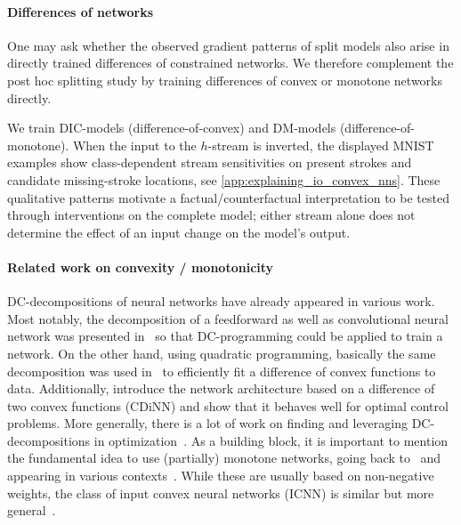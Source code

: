 \paragraph{Differences of networks}
One may ask whether the observed gradient patterns of split models also arise in directly trained differences of constrained networks.
We therefore complement the post hoc splitting study by training differences of convex or monotone networks directly.

We train DIC-models (difference-of-convex) and DM-models (difference-of-monotone). 
When the input to the $h$-stream is inverted, the displayed MNIST examples show class-dependent
stream sensitivities on present strokes and candidate missing-stroke locations, see
\cref{app:explaining_io_convex_nns}. These qualitative patterns motivate a factual/counterfactual
interpretation to be tested through interventions on the complete model; either stream alone
does not determine the effect of an input change on the model's output.

\paragraph{Related work on convexity / monotonicity} 
DC-decompositions of neural networks have already appeared in various work. 
Most notably, the decomposition of a feedforward as well as convolutional neural network was presented in~\citep{Awasthi2023DCNN} so that DC-programming could be applied to train a network. On the other hand, using quadratic programming, basically the same decomposition was used in~\citep{Siahkamari2020_DCRegression} to efficiently fit a difference of convex functions to data. 
Additionally, \citep{Sankaranarayanan2021CDINN} introduce the network architecture based on a difference of two convex functions (CDiNN) and show that it behaves well for optimal control problems.  
More generally, there is a lot of work on finding and leveraging DC-decompositions in optimization~\citep{Melzer1986_PLasDC,Kripfganz1987_PWAasDC,Zalgaller2000_DCRepresentation,Griewank2020_PolyhedralDCDecomposition,Schlueter2021_ConvexDecompPAF,Koutschan2024_MinimalArity,Kazda2024_LP_DCPLA,Brandenburg2025_DecompositionPolyhedra}.
As a building block, it is important to mention the fundamental idea to use (partially) monotone networks, going back to~\citep{Sill1997_MonotonicNetworks}
and appearing in various contexts~\citep{Sivaraman2020_COMET,sivaprasad2021curious,Nguyen2023_MonoNet,Liu2020CertifiedMonotone,Daniels2010_MonotoneNN}.
While these are usually based on non-negative weights, the class of input convex neural networks (ICNN) is similar but more general~\citep{Amos2017}.

